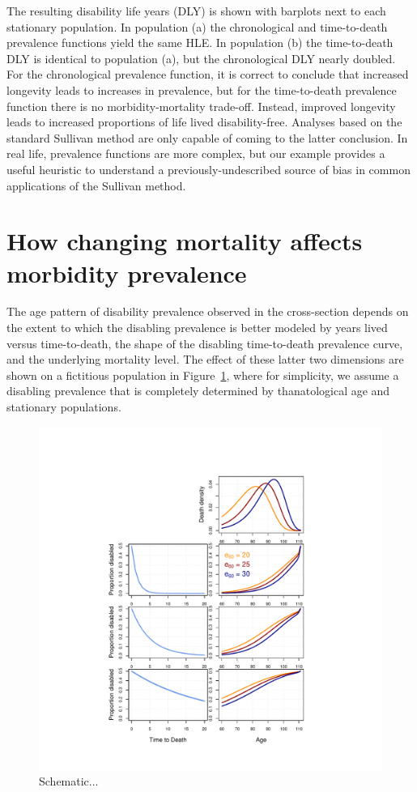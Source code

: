 \documentclass[11pt,oneside,a4paper]{article} %
\begin{document}
The resulting disability life years (DLY) is shown with
barplots next to each stationary population.
In population (a) the chronological and time-to-death prevalence functions yield
the same HLE. In population (b) the time-to-death DLY is identical to population
(a), but the chronological DLY nearly doubled. For the chronological prevalence
function, it is correct to conclude that increased longevity leads to
increases in prevalence, but for the time-to-death prevalence function there is
no morbidity-mortality trade-off. Instead, improved longevity leads to increased
proportions of life lived disability-free. Analyses based on the standard Sullivan method are only
capable of coming to the latter conclusion. In real life, prevalence functions
are more complex, but our example provides a useful heuristic to understand a
previously-undescribed source of bias in common applications of the Sullivan
method.

\section{How changing mortality affects morbidity prevalence}

The age pattern of disability prevalence observed in the cross-section depends on the extent to which the disabling prevalence is better modeled by years lived versus time-to-death, the shape of the disabling time-to-death prevalence curve, and the underlying mortality level. The effect of these latter two dimensions are shown on a fictitious population in Figure~\ref{fig:Fig_schematic3}, where for simplicity, we assume a disabling prevalence that is completely determined by thanatological age and stationary populations. 

\begin{figure}
\begin{adjustwidth}{-1.5cm}{}
	\centering
	\includegraphics[scale=.8]{schematic3.pdf}
	\caption{Schematic...}
	\label{fig:Fig_schematic3}
\end{adjustwidth}
\end{figure}
\end{document}

